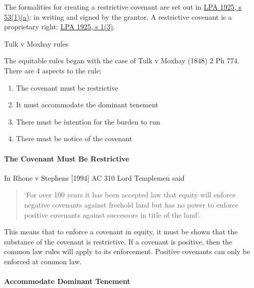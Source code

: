 \documentclass[
]{article}
\providecommand{\tightlist}{%
  \setlength{\itemsep}{0pt}\setlength{\parskip}{0pt}}
\newenvironment{env-9a1d7316-f242-42ab-b216-19df5e12c935}
{
    \savenotes\tcolorbox[blanker,breakable,left=5pt,borderline west={2pt}{-4pt}{pink}]
}
{
    \endtcolorbox\spewnotes
}
\begin{document}
The formalities for creating a restrictive covenant are set out in
\href{https://www.legislation.gov.uk/ukpga/Geo5/15-16/20/section/53}{LPA
1925, s 53(1)(a)}: in writing and signed by the grantor. A restrictive
covenant is a proprietary right:
\href{https://www.legislation.gov.uk/ukpga/Geo5/15-16/20/section/1}{LPA
1925, s 1(3)}.

\begin{env-9a1d7316-f242-42ab-b216-19df5e12c935}

Tulk v Moxhay rules

The equitable rules began with the case of Tulk v Moxhay (1848) 2 Ph
774. There are 4 aspects to the rule:

\begin{enumerate}
\tightlist
\item
  The covenant must be restrictive
\item
  It must accommodate the dominant tenement
\item
  There must be intention for the burden to run
\item
  There must be notice of the covenant
\end{enumerate}

\end{env-9a1d7316-f242-42ab-b216-19df5e12c935}

\hypertarget{the-covenant-must-be-restrictive}{%
\paragraph{The Covenant Must Be
Restrictive}\label{the-covenant-must-be-restrictive}}

In Rhone v Stephens {[}1994{]} AC 310 Lord Templemen said

\begin{quote}
`For over 100 years it has been accepted law that equity will enforce
negative covenants against freehold land but has no power to enforce
positive covenants against successors in title of the land'.
\end{quote}

This means that to enforce a covenant in equity, it must be shown that
the substance of the covenant is restrictive. If a covenant is positive,
then the common law rules will apply to its enforcement. Positive
covenants can only be enforced at common law.

\hypertarget{accommodate-dominant-tenement}{%
\paragraph{Accommodate Dominant
Tenement}\label{accommodate-dominant-tenement}}
\end{document}
